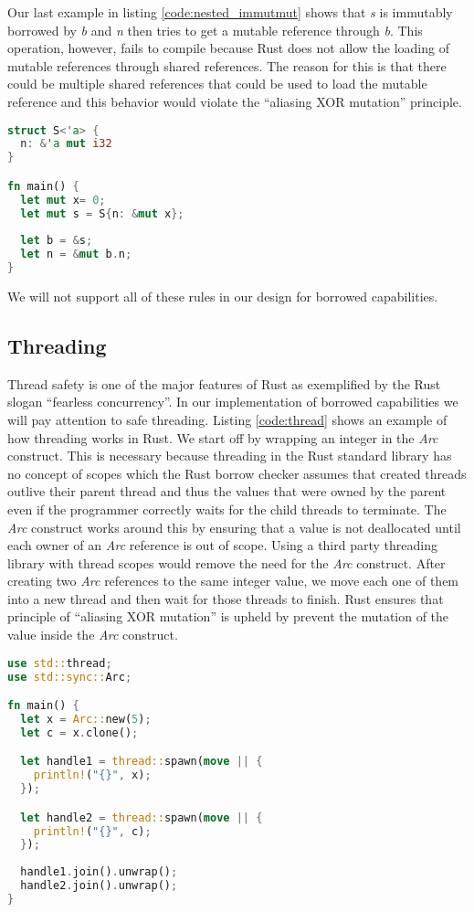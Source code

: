 Our last example in listing \ref{code:nested_immutmut} shows that \textit{s} is immutably borrowed by \textit{b} and \textit{n} then tries to get a mutable reference through \textit{b}.
This operation, however, fails to compile because Rust does not allow the loading of mutable references through shared references.
The reason for this is that there could be multiple shared references that could be used to load the mutable reference and this behavior would violate the ``aliasing XOR mutation'' principle.
\begin{lstlisting}[language=Rust,frame=single,caption=Mutable reference through shared borrow,label=code:nested_immutmut]
struct S<'a> {
  n: &'a mut i32
}

fn main() {
  let mut x= 0;
  let mut s = S{n: &mut x};
    
  let b = &s;
  let n = &mut b.n;
}
\end{lstlisting}

We will not support all of these rules in our design for borrowed capabilities.

\subsection{Threading}
Thread safety is one of the major features of Rust as exemplified by the Rust slogan ``fearless concurrency''.
In our implementation of borrowed capabilities we will pay attention to safe threading.
Listing \ref{code:thread} shows an example of how threading works in Rust.
We start off by wrapping an integer in the \textit{Arc} construct.
This is necessary because threading in the Rust standard library has no concept of scopes which the Rust borrow checker assumes that created threads outlive their parent thread and thus the values that were owned by the parent even if the programmer correctly waits for the child threads to terminate.
The \textit{Arc} construct works around this by ensuring that a value is not deallocated until each owner of an \textit{Arc} reference is out of scope.
Using a third party threading library with thread scopes would remove the need for the \textit{Arc} construct.
After creating two \textit{Arc} references to the same integer value, we move each one of them into a new thread and then wait for those threads to finish.
Rust ensures that principle of ``aliasing XOR mutation'' is upheld by prevent the mutation of the value inside the \textit{Arc} construct.

\begin{lstlisting}[language=Rust,frame=single,caption=Threading in Rust,label=code:thread]
use std::thread;
use std::sync::Arc;

fn main() {
  let x = Arc::new(5);
  let c = x.clone();

  let handle1 = thread::spawn(move || {
    println!("{}", x);
  });

  let handle2 = thread::spawn(move || {
    println!("{}", c);
  });
  
  handle1.join().unwrap();
  handle2.join().unwrap();
}
\end{lstlisting}

